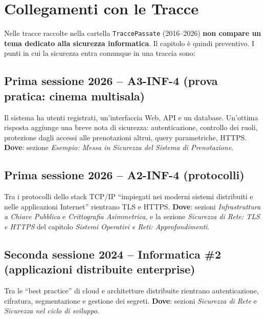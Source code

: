 
\section*{Collegamenti con le Tracce} %

Nelle tracce raccolte nella cartella \texttt{TraccePassate} (2016--2026) \textbf{non compare un tema dedicato alla sicurezza informatica}. Il capitolo è quindi preventivo. I punti in cui la sicurezza entra comunque in una traccia sono:

\subsection*{Prima sessione 2026 -- A3-INF-4 (prova pratica: cinema multisala)}
Il sistema ha utenti registrati, un'interfaccia Web, API e un database. Un'ottima risposta aggiunge una breve nota di sicurezza: autenticazione, controllo dei ruoli, protezione dagli accessi alle prenotazioni altrui, query parametriche, HTTPS. \textbf{Dove}: sezione \emph{Esempio: Messa in Sicurezza del Sistema di Prenotazione}.

\subsection*{Prima sessione 2026 -- A2-INF-4 (protocolli)}
Tra i protocolli dello stack TCP/IP ``impiegati nei moderni sistemi distribuiti e nelle applicazioni Internet'' rientrano TLS e HTTPS. \textbf{Dove}: sezioni \emph{Infrastruttura a Chiave Pubblica} e \emph{Crittografia Asimmetrica}, e la sezione \emph{Sicurezza di Rete: TLS e HTTPS} del capitolo \emph{Sistemi Operativi e Reti: Approfondimenti}.

\subsection*{Seconda sessione 2024 -- Informatica \#2 (applicazioni distribuite enterprise)}
Tra le ``best practice'' di cloud e architetture distribuite rientrano autenticazione, cifratura, segmentazione e gestione dei segreti. \textbf{Dove}: sezioni \emph{Sicurezza di Rete} e \emph{Sicurezza nel ciclo di sviluppo}.
